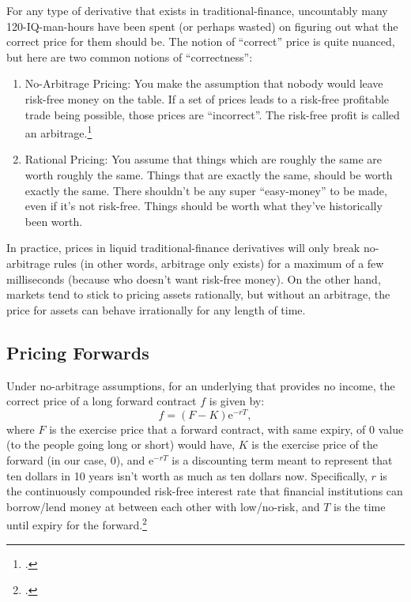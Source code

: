 \documentclass{article}
\begin{document}
	For any type of derivative that exists in traditional-finance, uncountably many 120-IQ-man-hours have been spent (or perhaps wasted) on figuring out what the correct price for them should be. The notion of ``correct'' price is quite nuanced, but here are two common notions of ``correctness'':
	\begin{enumerate}
		\item No-Arbitrage Pricing: You make the assumption that nobody would leave risk-free money on the table. If a set of prices leads to a risk-free profitable trade being possible, those prices are ``incorrect''. The risk-free profit is called an arbitrage.\footcite[126]{hull}
		\item Rational Pricing: You assume that things which are roughly the same are worth roughly the same. Things that are exactly the same, should be worth exactly the same. There shouldn't be any super ``easy-money'' to be made, even if it's not risk-free. Things should be worth what they've historically been worth.
	\end{enumerate}
	In practice, prices in liquid traditional-finance derivatives will only break no-arbitrage rules (in other words, arbitrage only exists) for a maximum of a few milliseconds (because who doesn't want risk-free money). On the other hand, markets tend to stick to pricing assets rationally, but without an arbitrage, the price for assets can behave irrationally for any length of time.
	\subsection{Pricing Forwards}
	Under no-arbitrage assumptions, for an underlying that provides no income, the correct price of a long forward contract $f$ is given by:
	\begin{equation}
		\label{forward-val}
		f = (F - K)\mathrm{e}^{-rT},
	\end{equation}
	where $F$ is the exercise price that a forward contract, with same expiry, of 0 value (to the people going long or short) would have, $K$ is the exercise price of the forward (in our case, 0), and $\mathrm{e}^{-rT}$ is a discounting term meant to represent that ten dollars in 10 years isn't worth as much as ten dollars now. Specifically, $r$ is the continuously compounded risk-free interest rate that financial institutions can borrow/lend money at between each other with low/no-risk, and $T$ is the time until expiry for the forward.\footcite[133]{hull}
	
\end{document}
